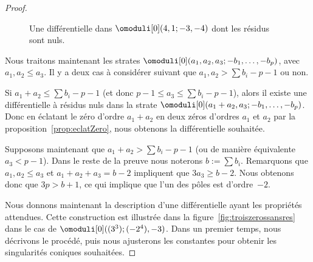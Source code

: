 \begin{proof}
\begin{figure}[htb]
\caption{Une différentielle dans $\omoduli[0](4,1;-3,-4)$ dont les résidus sont nuls.} \label{fig:ordremax}
\end{figure}
Nous traitons maintenant les strates $\omoduli[0](a_{1},a_{2},a_{3};-b_{1},\dots,-b_{p})$, avec \hbox{$a_{1}, a_{2}\!\leq\!a_{3}$}. Il y a deux cas à considérer suivant que $a_{1},a_{2}>\sum b_{i}-p-1$ ou non.
\par
Si $a_{1}+a_{2}\leq \sum b_{i}-p-1$ (et donc $p-1\leq a_{3} \leq \sum b_{i}-p-1$), alors il existe une différentielle à résidus nuls dans la strate $\omoduli[0](a_{1}+a_{2},a_{3};-b_{1},\dots,-b_{p})$. Donc en éclatant le zéro d'ordre $a_{1}+a_{2}$ en deux zéros d'ordres $a_{1}$ et $a_{2}$ par la proposition~\ref{prop:eclatZero}, nous obtenons la différentielle souhaitée.
\par
Supposons maintenant que $a_{1}+a_{2} > \sum b_{i}-p-1$ (ou de manière équivalente $a_{3}<p-1$). Dans le reste de la preuve nous noterons $b:=\sum b_{i}$. Remarquons que $a_{1},a_{2}\leq a_{3}$ et $a_{1}+a_{2}+a_{3}=b-2$ impliquent que $ 3a_{3} \geq b-2$. Nous obtenons donc que $3p>b+1$, ce qui implique que l'un des pôles est d'ordre~$-2$.
\par
Nous donnons maintenant la description d'une différentielle ayant les propriétés attendues. Cette construction est illustrée dans la figure~\ref{fig:troiszerossansres} dans le cas de $\omoduli[0]((3^3);(-2^4),-3)$. Dans un premier temps, nous décrivons le procédé, puis nous ajusterons les constantes pour obtenir les singularités coniques souhaitées.


\end{proof}
